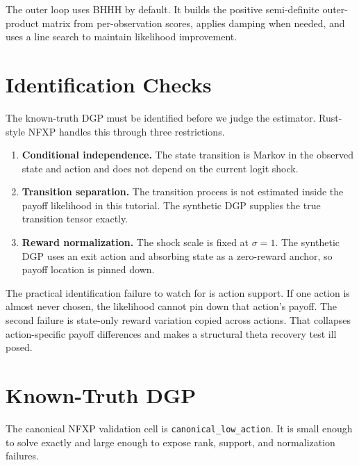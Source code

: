 \documentclass[10pt]{article}
\begin{document}
The outer loop uses BHHH by default. It builds the positive semi-definite
outer-product matrix from per-observation scores, applies damping when needed,
and uses a line search to maintain likelihood improvement.

\section{Identification Checks}

The known-truth DGP must be identified before we judge the estimator.
Rust-style NFXP handles this through three restrictions.

\begin{enumerate}
\item \textbf{Conditional independence.} The state transition is Markov in the
observed state and action and does not depend on the current logit shock.
\item \textbf{Transition separation.} The transition process is not estimated
inside the payoff likelihood in this tutorial. The synthetic DGP supplies the
true transition tensor exactly.
\item \textbf{Reward normalization.} The shock scale is fixed at $\sigma=1$.
The synthetic DGP uses an exit action and absorbing state as a zero-reward
anchor, so payoff location is pinned down.
\end{enumerate}

The practical identification failure to watch for is action support. If one
action is almost never chosen, the likelihood cannot pin down that action's
payoff. The second failure is state-only reward variation copied across
actions. That collapses action-specific payoff differences and makes a
structural theta recovery test ill posed.

\section{Known-Truth DGP}

The canonical NFXP validation cell is \texttt{canonical\_low\_action}. It is
small enough to solve exactly and large enough to expose rank, support, and
normalization failures.
\end{document}
